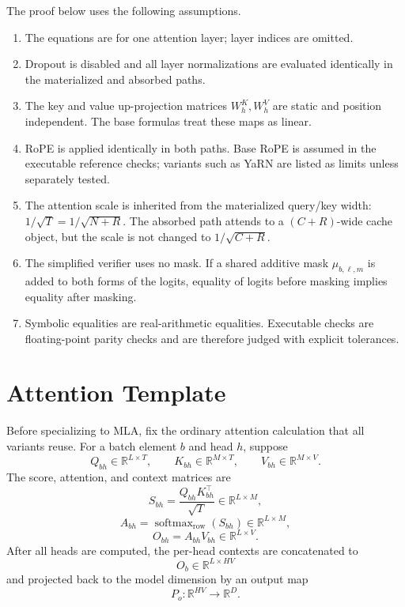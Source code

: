 \documentclass[11pt]{article}
\newcommand{\R}{\mathbb{R}}
\newcommand{\softmax}{\operatorname{softmax}}
\begin{document}
The proof below uses the following assumptions.
\begin{enumerate}
  \item The equations are for one attention layer; layer indices are omitted.
  \item Dropout is disabled and all layer normalizations are evaluated
        identically in the materialized and absorbed paths.
  \item The key and value up-projection matrices $W^K_h,W^V_h$ are static and
        position independent.  The base formulas treat these maps as linear.
  \item RoPE is applied identically in both paths.  Base RoPE is assumed in the
        executable reference checks; variants such as YaRN are listed as limits
        unless separately tested.
  \item The attention scale is inherited from the materialized query/key width:
        $1/\sqrt{T}=1/\sqrt{N+R}$.  The absorbed path attends to a
        $(C+R)$-wide cache object, but the scale is not changed to
        $1/\sqrt{C+R}$.
  \item The simplified verifier uses no mask.  If a shared additive mask
        $\mu_{b,\ell,m}$ is added to both forms of the logits, equality of
        logits before masking implies equality after masking.
  \item Symbolic equalities are real-arithmetic equalities.  Executable checks
        are floating-point parity checks and are therefore judged with explicit
        tolerances.
\end{enumerate}

\section{Attention Template}

Before specializing to MLA, fix the ordinary attention calculation that all
variants reuse.  For a batch element $b$ and head $h$, suppose
\[
  Q_{bh}\in\R^{L\times T},
  \qquad
  K_{bh}\in\R^{M\times T},
  \qquad
  V_{bh}\in\R^{M\times V}.
\]
The score, attention, and context matrices are
\[
  S_{bh}
  =
  \frac{Q_{bh}K_{bh}^{\top}}{\sqrt{T}}
  \in\R^{L\times M},
\]
\[
  A_{bh}
  =
  \softmax_{\mathrm{row}}(S_{bh})
  \in\R^{L\times M},
\]
\[
  O_{bh}
  =
  A_{bh}V_{bh}
  \in\R^{L\times V}.
\]
After all heads are computed, the per-head contexts are concatenated to
\[
  O_b\in\R^{L\times HV}
\]
and projected back to the model dimension by an output map
\[
  P_o:\R^{HV}\to\R^D.
\]
\end{document}
